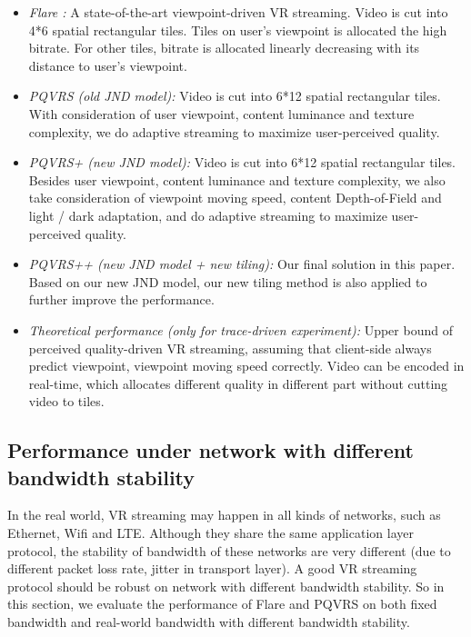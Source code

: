 \begin{itemize}

\item \emph{Flare \cite{Flare}:} A state-of-the-art viewpoint-driven VR streaming. Video is cut into 4*6 spatial rectangular tiles. Tiles on user's viewpoint is allocated the high bitrate. For other tiles, bitrate is allocated linearly decreasing with its distance to user's viewpoint.

\item \emph{PQVRS (old JND model):} Video is cut into 6*12 spatial rectangular tiles. With consideration of user viewpoint, content luminance and texture complexity, we do adaptive streaming to maximize user-perceived quality.

\item \emph{PQVRS+ (new JND model):} Video is cut into 6*12 spatial rectangular tiles. Besides user viewpoint, content luminance and texture complexity, we also take consideration of viewpoint moving speed, content Depth-of-Field and light / dark adaptation, and do adaptive streaming to maximize user-perceived quality.

\item \emph{PQVRS++ (new JND model + new tiling):} Our final solution in this paper. Based on our new JND model, our new tiling method is also applied to further improve the performance.

\item \emph{Theoretical performance (only for trace-driven experiment):} Upper bound of perceived quality-driven VR streaming, assuming that client-side always predict viewpoint, viewpoint moving speed correctly. Video can be encoded in real-time, which allocates different quality in different part without cutting video to tiles.

\end{itemize}

\subsection{Performance under network with different bandwidth stability}

In the real world, VR streaming may happen in all kinds of networks, such as Ethernet, Wifi and LTE. Although they share the same application layer protocol, the stability of bandwidth of these networks are very different (due to different packet loss rate, jitter in transport layer). A good VR streaming protocol should be robust on network with different bandwidth stability. So in this section, we evaluate the performance of Flare and PQVRS on both fixed bandwidth and real-world bandwidth with different bandwidth stability.

